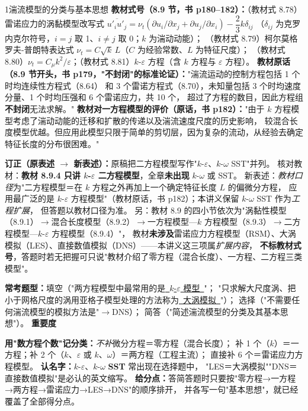\begin{kaodian}{1}{湍流模型的分类与基本思想}
\textbf{教材式号（8.9 节，书 p180--182）：}（教材式 8.78）雷诺应力的涡黏模型改写式
$\overline{u'_iu'_j}=\nu_t\left(\partial u_i/\partial x_j+\partial u_j/\partial x_i\right)-\dfrac23k\delta_{ij}$
（$\delta_{ij}$ 为克罗内克尔符号，$i=j$ 取 1、$i\neq j$ 取 0；$k$ 为湍动动能）；
（教材式 8.79）柯尔莫格罗夫-普朗特表达式 $\nu_t=C\sqrt{k}\,L$（$C$ 为经验常数、$L$ 为特征尺度）；
（教材式 8.80）$\nu_t=C_\mu k^2/\varepsilon$；（教材式 8.81）$k$-$\varepsilon$ 方程（含 $k$ 方程与 $\varepsilon$ 方程）。
\textbf{教材原话（8.9 节开头，书 p179，"不封闭"的标准论证）：}"湍流运动的控制方程包括 1 个时均连续性方程式（8.64）
和 3 个雷诺方程式（8.70），未知量包括 3 个时均速度分量、1 个时均压强和 6 个雷诺应力，共 10 个，
超过了方程的数目，因此方程组\textbf{不封闭}无法求解。"
\textbf{教材对一方程模型的评价（原话，书 p182）：}"由于 $k$ 方程模型考虑了湍动动能的迁移和扩散的传递以及湍流速度尺度的历史影响，
较混合长度模型优越。但应用此模型只限于简单的剪切层，因为复杂的流动，从经验去确定特征长度的分布很困难。"

\begin{tishi}
\textbf{订正（原表述 $\to$ 新表述）：}原稿把二方程模型写作"$k$-$\varepsilon$、$k$-$\omega$ SST"并列。
核对教材：\textbf{教材 8.9.4 只讲 $k$-$\varepsilon$ 二方程模型}，全章\textbf{未出现} $k$-$\omega$ 或 SST。
新表述：\emph{教材口径}为"二方程模型＝在 $k$ 方程之外再加上一个确定特征长度 $L$ 的偏微分方程，
应用最广泛的是 $k$-$\varepsilon$ 方程模型"（教材原话，书 p182）；本讲义保留 $k$-$\omega$ SST 作为\emph{工程扩展}，
但答题以教材口径为准。
另：教材 8.9 的四小节依次为"涡黏性模型（8.9.1）$\to$混合长度模型（8.9.2）$\to$一方程模型—$k$ 方程模型（8.9.3）$\to$二方程模型—$k$-$\varepsilon$ 方程模型（8.9.4）"，
教材\textbf{未涉及}雷诺应力方程模型（RSM）、大涡模拟（LES）、直接数值模拟（DNS）——本讲义这三项属\emph{扩展内容}，
\textbf{不标教材式号}，答题时若无把握可只说"教材介绍了零方程（混合长度）、一方程、二方程三类模型"。
\end{tishi}

\textbf{常考题型：}填空（"两方程模型中最常用的是\underline{\ $k$-$\varepsilon$ 模型\ }"；
"只求解大尺度涡、把小于网格尺度的涡用亚格子模型处理的方法称为\underline{\ 大涡模拟\ }"）；
选择（"不需要任何湍流模型的模拟方法是"$\to$DNS）；
简答（"简述湍流模型的分类及其基本思想"）。
\textbf{重要度 }\quad{}\quad{}

\begin{banfa}
\textbf{用"数方程个数"记分类：}\emph{不补}微分方程＝零方程（混合长度）；
补 1 个（$k$）＝一方程；补 2 个（$k$、$\varepsilon$ 或 $k$、$\omega$）＝两方程（工程主流）；
直接补 6 个＝雷诺应力方程模型。
\textbf{认名字：}$k$-$\varepsilon$、$k$-$\omega$ \textbf{SST} 常出现在选择题中，
"LES＝大涡模拟""DNS＝直接数值模拟"是必认的英文缩写。
\textbf{给分点：}答简答题时只要按"零方程→一方程→两方程→雷诺应力→LES→DNS"的顺序排开，
并各写一句"基本思想"，就已经覆盖了全部得分点。
\end{banfa}


\end{kaodian}
